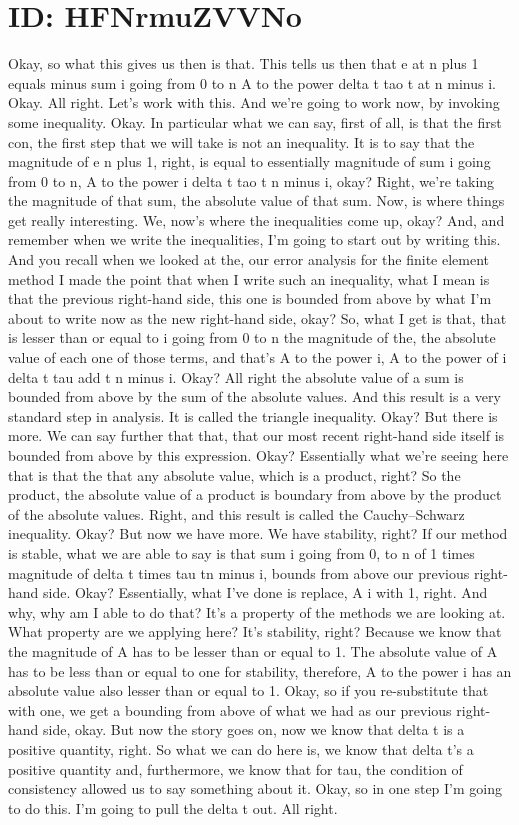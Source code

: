 \documentclass[10pt]{article}
\begin{document}
\section*{ID: HFNrmuZVVNo}
Okay, so what this gives us then is that. This tells us then that e at n plus 1 equals minus sum i going from 0 to n A to the power delta t tao t at n minus i. Okay. All right. Let's work with this. And we're going to work now, by invoking some inequality. Okay. In particular what we can say, first of all, is that the first con, the first step that we will take is not an inequality. It is to say that the magnitude of e n plus 1, right, is equal to essentially magnitude of sum i going from 0 to n, A to the power i delta t tao t n minus i, okay? Right, we're taking the magnitude of that sum, the absolute value of that sum. Now, is where things get really interesting. We, now's where the inequalities come up, okay? And, and remember when we write the inequalities, I'm going to start out by writing this. And you recall when we looked at the, our error analysis for the finite element method I made the point that when I write such an inequality, what I mean is that the previous right-hand side, this one is bounded from above by what I'm about to write now as the new right-hand side, okay? So, what I get is that, that is lesser than or equal to i going from 0 to n the magnitude of the, the absolute value of each one of those terms, and that's A to the power i, A to the power of i delta t tau add t n minus i. Okay? All right the absolute value of a sum is bounded from above by the sum of the absolute values. And this result is a very standard step in analysis. It is called the triangle inequality. Okay? But there is more. We can say further that that, that our most recent right-hand side itself is bounded from above by this expression. Okay? Essentially what we're seeing here that is that the that any absolute value, which is a product, right? So the product, the absolute value of a product is boundary from above by the product of the absolute values. Right, and this result is called the Cauchy–Schwarz inequality. Okay? But now we have more. We have stability, right? If our method is stable, what we are able to say is that sum i going from 0, to n of 1 times magnitude of delta t times tau tn minus i, bounds from above our previous right-hand side. Okay? Essentially, what I've done is replace, A i with 1, right. And why, why am I able to do that? It's a property of the methods we are looking at. What property are we applying here? It's stability, right? Because we know that the magnitude of A has to be lesser than or equal to 1. The absolute value of A has to be less than or equal to one for stability, therefore, A to the power i has an absolute value also lesser than or equal to 1. Okay, so if you re-substitute that with one, we get a bounding from above of what we had as our previous right-hand side, okay. But now the story goes on, now we know that delta t is a positive quantity, right. So what we can do here is, we know that delta t's a positive quantity and, furthermore, we know that for tau, the condition of consistency allowed us to say something about it. Okay, so in one step I'm going to do this. I'm going to pull the delta t out. All right. 
\end{document}
